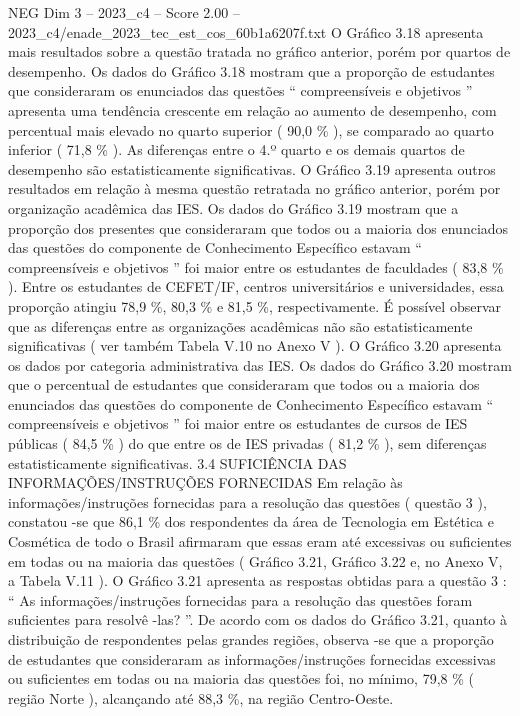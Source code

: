 \begin{textsample}{NEG Dim 3 – 2023\_c4 – Score 2.00 – 2023\_c4/enade\_2023\_tec\_est\_cos\_60b1a6207f.txt}
O Gráfico 3.18 apresenta mais resultados sobre a questão tratada no gráfico anterior, porém por quartos de desempenho.
Os dados do Gráfico 3.18 mostram que a proporção de estudantes que consideraram os enunciados das questões “ compreensíveis e objetivos ” apresenta uma tendência crescente em relação ao aumento de desempenho, com percentual mais elevado no quarto superior ( 90,0 \% ), se comparado ao quarto inferior ( 71,8 \% ).
As diferenças entre o 4.º quarto e os demais quartos de desempenho são estatisticamente significativas.
O Gráfico 3.19 apresenta outros resultados em relação à mesma questão retratada no gráfico anterior, porém por organização acadêmica das IES.
Os dados do Gráfico 3.19 mostram que a proporção dos presentes que consideraram que todos ou a maioria dos enunciados das questões do componente de Conhecimento Específico estavam “ compreensíveis e objetivos ” foi maior entre os estudantes de faculdades ( 83,8 \% ).
Entre os estudantes de CEFET/IF, centros universitários e universidades, essa proporção atingiu 78,9 \%, 80,3 \% e 81,5 \%, respectivamente.
É possível observar que as diferenças entre as organizações acadêmicas não são estatisticamente significativas ( ver também Tabela V.10 no Anexo V ).
O Gráfico 3.20 apresenta os dados por categoria administrativa das IES.
Os dados do Gráfico 3.20 mostram que o percentual de estudantes que consideraram que todos ou a maioria dos enunciados das questões do componente de Conhecimento Específico estavam “ compreensíveis e objetivos ” foi maior entre os estudantes de cursos de IES públicas ( 84,5 \% ) do que entre os de IES privadas ( 81,2 \% ), sem diferenças estatisticamente significativas. 3.4 SUFICIÊNCIA DAS INFORMAÇÕES/INSTRUÇÕES FORNECIDAS Em relação às informações/instruções fornecidas para a resolução das questões ( questão 3 ), constatou -se que 86,1 \% dos respondentes da área de Tecnologia em Estética e Cosmética de todo o Brasil afirmaram que essas eram até excessivas ou suficientes em todas ou na maioria das questões ( Gráfico 3.21, Gráfico 3.22 e, no Anexo V, a Tabela V.11 ).
O Gráfico 3.21 apresenta as respostas obtidas para a questão 3 : “ As informações/instruções fornecidas para a resolução das questões foram suficientes para resolvê -las? ”.
De acordo com os dados do Gráfico 3.21, quanto à distribuição de respondentes pelas grandes regiões, observa -se que a proporção de estudantes que consideraram as informações/instruções fornecidas excessivas ou suficientes em todas ou na maioria das questões foi, no mínimo, 79,8 \% ( região Norte ), alcançando até 88,3 \%, na região Centro-Oeste.

\end{textsample}
